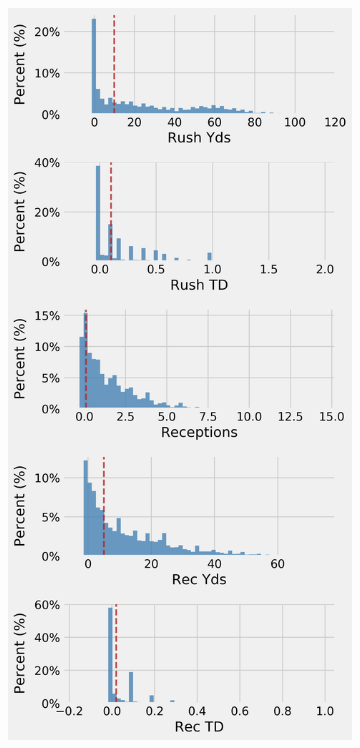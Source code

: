 \documentclass[12pt]{article}
\begin{document}
\pagebreak
\begin{figure}[H]
  \centering
  \begin{subfigure}[b]{0.450\textwidth}
    \centering
    \includegraphics[width=1\textwidth]{../figures/no_threshold_hist_RB}

\end{subfigure}
\end{figure}
\end{document}
